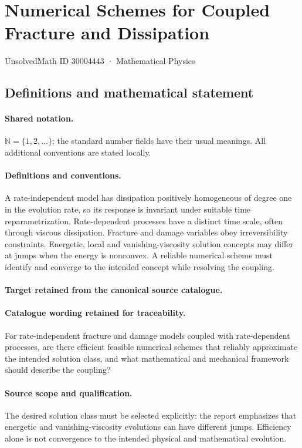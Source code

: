 \documentclass[11pt]{article}
\begin{document}
\setcounter{section}{30004442}
\section{Numerical Schemes for Coupled Fracture and Dissipation}\label{30004443}
{\small UnsolvedMath ID 30004443 · Mathematical Physics}
\subsection{Definitions and mathematical statement}

\paragraph{Shared notation.}$\mathbb N=\{1,2,\ldots\}$; the standard number fields have their usual meanings. All additional conventions are stated locally.


\paragraph{Definitions and conventions.}
A rate-independent model has dissipation positively homogeneous of degree one in the evolution rate, so its response is invariant under suitable time reparametrization. Rate-dependent processes have a distinct time scale, often through viscous dissipation. Fracture and damage variables obey irreversibility constraints. Energetic, local and vanishing-viscosity solution concepts may differ at jumps when the energy is nonconvex. A reliable numerical scheme must identify and converge to the intended concept while resolving the coupling.

\paragraph{Target retained from the canonical source catalogue.}
\paragraph{Catalogue wording retained for traceability.}
For rate-independent fracture and damage models coupled with rate-dependent processes, are there efficient feasible numerical schemes that reliably approximate the intended solution class, and what mathematical and mechanical framework should describe the coupling?

\paragraph{Source scope and qualification.}
The desired solution class must be selected explicitly: the report emphasizes that energetic and vanishing-viscosity evolutions can have different jumps. Efficiency alone is not convergence to the intended physical and mathematical evolution.
\end{document}
